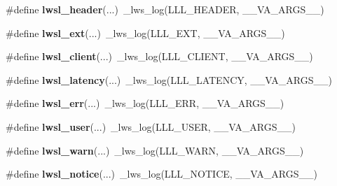 \begin{DoxyCompactItemize}
\item 
\mbox{\label{group__log_gaab72aa186eff075fb3d229cb99a35434}} 
\#define {\bfseries lwsl\+\_\+header}(...)~\+\_\+lws\+\_\+log(L\+L\+L\+\_\+\+H\+E\+A\+D\+ER, \+\_\+\+\_\+\+V\+A\+\_\+\+A\+R\+G\+S\+\_\+\+\_\+)
\item 
\mbox{\label{group__log_ga8e0877b452d80bc154793ad81bfce742}} 
\#define {\bfseries lwsl\+\_\+ext}(...)~\+\_\+lws\+\_\+log(L\+L\+L\+\_\+\+E\+XT, \+\_\+\+\_\+\+V\+A\+\_\+\+A\+R\+G\+S\+\_\+\+\_\+)
\item 
\mbox{\label{group__log_ga181ea1ed9ba604e493ce092850d9da90}} 
\#define {\bfseries lwsl\+\_\+client}(...)~\+\_\+lws\+\_\+log(L\+L\+L\+\_\+\+C\+L\+I\+E\+NT, \+\_\+\+\_\+\+V\+A\+\_\+\+A\+R\+G\+S\+\_\+\+\_\+)
\item 
\mbox{\label{group__log_gab5842ee4ec5f763d057869e083ff1cb0}} 
\#define {\bfseries lwsl\+\_\+latency}(...)~\+\_\+lws\+\_\+log(L\+L\+L\+\_\+\+L\+A\+T\+E\+N\+CY, \+\_\+\+\_\+\+V\+A\+\_\+\+A\+R\+G\+S\+\_\+\+\_\+)
\item 
\mbox{\label{group__log_gad44c15d00076052a398244035a7dbb56}} 
\#define {\bfseries lwsl\+\_\+err}(...)~\+\_\+lws\+\_\+log(L\+L\+L\+\_\+\+E\+RR, \+\_\+\+\_\+\+V\+A\+\_\+\+A\+R\+G\+S\+\_\+\+\_\+)
\item 
\mbox{\label{group__log_ga9aad07786eb4b3189b0eac919b2a960f}} 
\#define {\bfseries lwsl\+\_\+user}(...)~\+\_\+lws\+\_\+log(L\+L\+L\+\_\+\+U\+S\+ER, \+\_\+\+\_\+\+V\+A\+\_\+\+A\+R\+G\+S\+\_\+\+\_\+)
\item 
\mbox{\label{group__log_ga1bcd293826c0a91d6e7ac3c54db72885}} 
\#define {\bfseries lwsl\+\_\+warn}(...)~\+\_\+lws\+\_\+log(L\+L\+L\+\_\+\+W\+A\+RN, \+\_\+\+\_\+\+V\+A\+\_\+\+A\+R\+G\+S\+\_\+\+\_\+)
\item 
\mbox{\label{group__log_ga86b3c56c638569eb93919c52a1d5dfaf}} 
\#define {\bfseries lwsl\+\_\+notice}(...)~\+\_\+lws\+\_\+log(L\+L\+L\+\_\+\+N\+O\+T\+I\+CE, \+\_\+\+\_\+\+V\+A\+\_\+\+A\+R\+G\+S\+\_\+\+\_\+)
\item 
\mbox{\label{group__log_gaf13957a4d9fb47c070b9320303c32502}} 

\end{DoxyCompactItemize}
